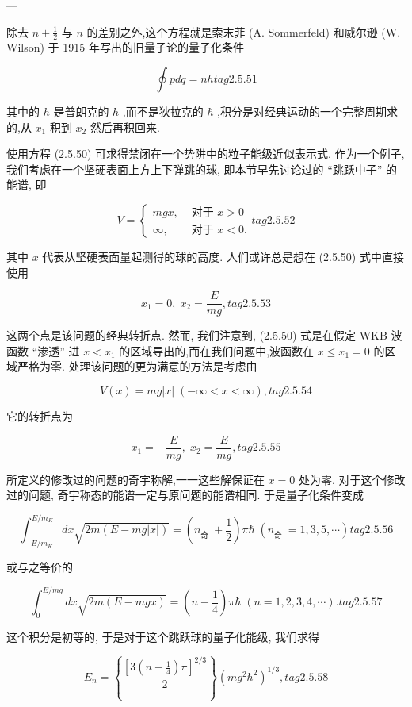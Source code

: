 \documentclass[lang=cn,newtx,10pt,scheme=chinese,thmcnt=section]{elegantbook}
\begin{document}
---

除去 $n + \frac{1}{2}$ 与 $n$ 的差别之外,这个方程就是索末菲 (A. Sommerfeld) 和威尔逊 (W. Wilson) 于 1915 年写出的旧量子论的量子化条件

$$
\oint {pdq} = {nh} tag{2.5.51}
$$

其中的 $h$ 是普朗克的 $h$ ,而不是狄拉克的 $\hbar$ ,积分是对经典运动的一个完整周期求的,从 ${x}_{1}$ 积到 ${x}_{2}$ 然后再积回来.

使用方程 (2.5.50) 可求得禁闭在一个势阱中的粒子能级近似表示式. 作为一个例子, 我们考虑在一个坚硬表面上方上下弹跳的球, 即本节早先讨论过的 “跳跃中子” 的能谱, 即

$$
V = \left\{ \begin{array}{ll} {mgx}, & \text{ 对于 }x > 0 \\ \infty , & \text{ 对于 }x < 0. \end{array}\right. tag{2.5.52}
$$

其中 $x$ 代表从坚硬表面量起测得的球的高度. 人们或许总是想在 (2.5.50) 式中直接使用

$$
{x}_{1} = 0,\;{x}_{2} = \frac{E}{mg}, tag{2.5.53}
$$

这两个点是该问题的经典转折点. 然而, 我们注意到, (2.5.50) 式是在假定 WKB 波函数 “渗透” 进 $x < {x}_{1}$ 的区域导出的,而在我们问题中,波函数在 $x \leq {x}_{1} = 0$ 的区域严格为零. 处理该问题的更为满意的方法是考虑由

$$
V\left( x\right) = {mg}\left| x\right| \;\left( {-\infty < x < \infty }\right) , tag{2.5.54}
$$

它的转折点为

$$
{x}_{1} = - \frac{E}{mg},\;{x}_{2} = \frac{E}{mg}, tag{2.5.55}
$$

所定义的修改过的问题的奇宇称解,一一这些解保证在 $x = 0$ 处为零. 对于这个修改过的问题, 奇宇称态的能谱一定与原问题的能谱相同. 于是量子化条件变成

$$
{\int }_{-E/{m}_{K}}^{E/{m}_{K}}{dx}\sqrt{{2m}\left( {E - {mg}\left| x\right| }\right) } = \left( {{n}_{\text{奇 }} + \frac{1}{2}}\right) \pi \hbar \;\left( {{n}_{\text{奇 }} = 1,3,5,\cdots }\right) tag{2.5.56}
$$

或与之等价的

$$
{\int }_{0}^{E/{mg}}{dx}\sqrt{{2m}\left( {E - {mgx}}\right) } = \left( {n - \frac{1}{4}}\right) \pi \hbar \;\left( {n = 1,2,3,4,\cdots }\right) . tag{2.5.57}
$$

这个积分是初等的, 于是对于这个跳跃球的量子化能级, 我们求得

$$
{E}_{n} = \left\{ \frac{{\left\lbrack 3\left( n - \frac{1}{4}\right) \pi \right\rbrack }^{2/3}}{2}\right\} {\left( m{g}^{2}{\hbar }^{2}\right) }^{1/3}, tag{2. 5.58}
$$
\end{document}
